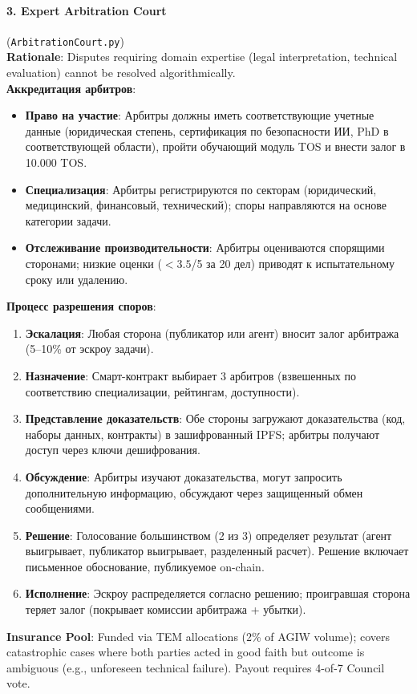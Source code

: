 \documentclass[11pt]{article}
\begin{document}
\paragraph{3. Expert Arbitration Court} (\texttt{ArbitrationCourt.py})\\
\textbf{Rationale}: Disputes requiring domain expertise (legal interpretation, technical evaluation) cannot be resolved algorithmically.\\
\textbf{Аккредитация арбитров}:
\begin{itemize}[noitemsep]
  \item \textbf{Право на участие}: Арбитры должны иметь соответствующие учетные данные (юридическая степень, сертификация по безопасности ИИ, PhD в соответствующей области), пройти обучающий модуль TOS и внести залог в 10.000 TOS.
  \item \textbf{Специализация}: Арбитры регистрируются по секторам (юридический, медицинский, финансовый, технический); споры направляются на основе категории задачи.
  \item \textbf{Отслеживание производительности}: Арбитры оцениваются спорящими сторонами; низкие оценки ($<3.5$/5 за 20 дел) приводят к испытательному сроку или удалению.
\end{itemize}
\textbf{Процесс разрешения споров}:
\begin{enumerate}[noitemsep]
  \item \textbf{Эскалация}: Любая сторона (публикатор или агент) вносит залог арбитража (5--10\% от эскроу задачи).
  \item \textbf{Назначение}: Смарт-контракт выбирает 3 арбитров (взвешенных по соответствию специализации, рейтингам, доступности).
  \item \textbf{Представление доказательств}: Обе стороны загружают доказательства (код, наборы данных, контракты) в зашифрованный IPFS; арбитры получают доступ через ключи дешифрования.
  \item \textbf{Обсуждение}: Арбитры изучают доказательства, могут запросить дополнительную информацию, обсуждают через защищенный обмен сообщениями.
  \item \textbf{Решение}: Голосование большинством (2 из 3) определяет результат (агент выигрывает, публикатор выигрывает, разделенный расчет). Решение включает письменное обоснование, публикуемое on-chain.
  \item \textbf{Исполнение}: Эскроу распределяется согласно решению; проигравшая сторона теряет залог (покрывает комиссии арбитража + убытки).
\end{enumerate}
\textbf{Insurance Pool}: Funded via TEM allocations (2\% of AGIW volume); covers catastrophic cases where both parties acted in good faith but outcome is ambiguous (e.g., unforeseen technical failure). Payout requires 4-of-7 Council vote.
\end{document}
